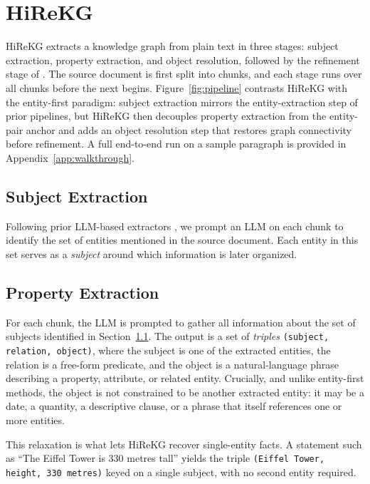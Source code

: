\documentclass[11pt]{article}
\begin{document}
\section{HiReKG}
\label{sec:method}
HiReKG extracts a knowledge graph from plain text in three stages: subject extraction, property extraction, and object resolution, followed by the refinement stage of \citet{kggen}. The source document is first split into chunks, and each stage runs over all chunks before the next begins. Figure~\ref{fig:pipeline} contrasts HiReKG with the entity-first paradigm: subject extraction mirrors the entity-extraction step of prior pipelines, but HiReKG then decouples property extraction from the entity-pair anchor and adds an object resolution step that restores graph connectivity before refinement. A full end-to-end run on a sample paragraph is provided in Appendix~\ref{app:walkthrough}.

\subsection{Subject Extraction}
\label{sec:method-subject}
Following prior LLM-based extractors \citep{kggen, rakg}, we prompt an LLM on each chunk to identify the set of entities mentioned in the source document. Each entity in this set serves as a \emph{subject} around which information is later organized.


\subsection{Property Extraction}
\label{sec:method-property}
For each chunk, the LLM is prompted to gather all information about the set of subjects identified in Section~\ref{sec:method-subject}. The output is a set of \emph{triples} \texttt{(subject, relation, object)}, where the subject is one of the extracted entities, the relation is a free-form predicate, and the object is a natural-language phrase describing a property, attribute, or related entity. Crucially, and unlike entity-first methods, the object is not constrained to be another extracted entity: it may be a date, a quantity, a descriptive clause, or a phrase that itself references one or more entities.

This relaxation is what lets HiReKG recover single-entity facts. A statement such as ``The Eiffel Tower is 330 metres tall'' yields the triple \texttt{(Eiffel Tower, height, 330 metres)} keyed on a single subject, with no second entity required. 
\end{document}
